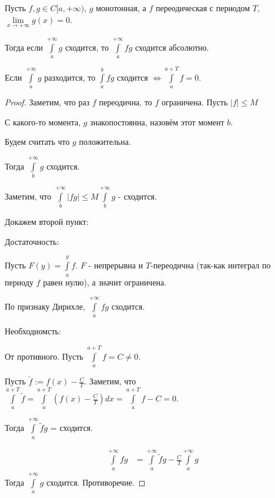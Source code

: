 \begin{theorem} \thmslashn

    Пусть $f, g\in C[a, +\infty)$, $g$ монотонная, а  $f$ переодическая с периодом $T$, $\lim\limits_{x \to +\infty} g(x) = 0$.

    Тогда если $\int\limits_{a}^{+\infty} g $ сходится, то $\int\limits_{a}^{+\infty} fg $ сходится абсолютно.

    Если $\int\limits_{a}^{+\infty} g $ разходится, то $\int\limits_{a}^{b} fg $ сходится $\iff \int\limits_{a}^{a+T} f = 0 $.
    \begin{proof}
        Заметим, что раз $f$ переодична, то $f$ ограничена. Пусть $|f| \le M$

        С какого-то момента, $g$ знакопостоянна, назовём этот момент $b$.

        Будем считать что $g$  положительна.

        Тогда $\int\limits_{b}^{+\infty} g $ сходится.

        Заметим, что $\int\limits_{b}^{+\infty} |fg| \le  M \int\limits_{b}^{+\infty} g $ - сходится.

        Докажем второй пункт:

        Достаточность:

        Пусть $F(y) = \int\limits_{a}^{y} f $. $F$ - непрерывна и $T$-переодична (так-как интеграл по периоду $f$ равен нулю), а значит ограничена.

        По признаку Дирихле, $\int\limits_{a}^{+\infty} fg $ сходится.

        Необходиомсть:

        От противного. Пусть $\int\limits_{a}^{a+T} f = C \neq 0 $. 

        Пусть $\tilde{f} := f(x) - \frac{C}{T}$. Заметим, что $\int\limits_{a}^{a+T} \tilde{f} = \int\limits_{a}^{a+T} (f(x) - \frac{C}{T})dx = \int\limits_{a}^{a+T} f - C = 0  $.

        Тогда $\int\limits_{a}^{+\infty} \tilde{f}g $ = сходится.

        \begin{equation*}
            \begin{split}
                \int\limits_{a}^{+\infty} fg 
                &= \int\limits_{a}^{+\infty} \tilde{f}g - \frac{C}{T}\int\limits_{a}^{+\infty} g  
            \end{split}
        \end{equation*}
        Тогда $\int\limits_{a}^{+\infty} g$ сходится. Противоречие.
    \end{proof}
\end{theorem}
